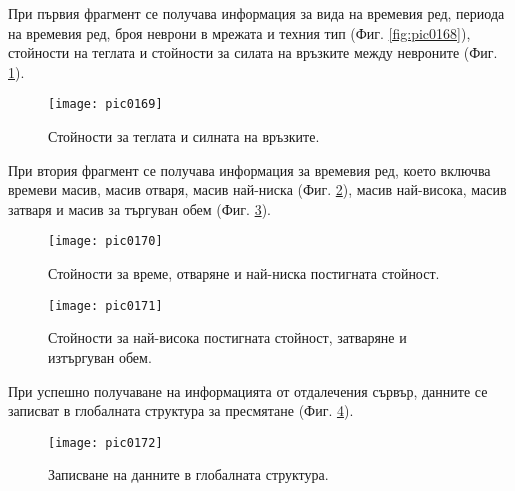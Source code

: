 При първия фрагмент се получава информация за вида на времевия ред, периода на времевия ред, броя неврони в мрежата и техния тип (Фиг. \ref{fig:pic0168}), стойности на теглата и стойности за силата на връзките между невроните (Фиг. \ref{fig:pic0169}).

\begin{figure}[h]
  \centering
  \texttt{[image: pic0169]}
  \caption{Стойности за теглата и силната на връзките.}
\label{fig:pic0169}
\end{figure}
\FloatBarrier

При втория фрагмент се получава информация за времевия ред, което включва времеви масив, масив отваря, масив най-ниска (Фиг. \ref{fig:pic0170}), масив най-висока, масив затваря и масив за търгуван обем (Фиг. \ref{fig:pic0171}).

\begin{figure}[h]
  \centering
  \texttt{[image: pic0170]}
  \caption{Стойности за време, отваряне и най-ниска постигната стойност.}
\label{fig:pic0170}
\end{figure}
\FloatBarrier

\begin{figure}[h]
  \centering
  \texttt{[image: pic0171]}
  \caption{Стойности за най-висока постигната стойност, затваряне и изтъргуван обем.}
\label{fig:pic0171}
\end{figure}
\FloatBarrier

При успешно получаване на информацията от отдалечения сървър, данните се записват в глобалната структура за пресмятане (Фиг. \ref{fig:pic0172}).

\begin{figure}[h]
  \centering
  \texttt{[image: pic0172]}
  \caption{Записване на данните в глобалната структура.}
\label{fig:pic0172}
\end{figure}
\FloatBarrier
